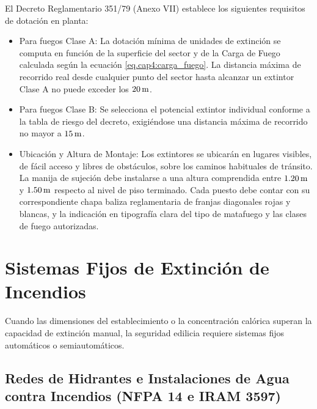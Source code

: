 El Decreto Reglamentario 351/79 (Anexo VII) establece los siguientes requisitos de dotación en planta:
\begin{itemize}
    \item Para fuegos Clase A: La dotación mínima de unidades de extinción se computa en función de la superficie del
          sector y de la Carga de Fuego calculada según la ecuación \ref{eq.cap4:carga_fuego}. La distancia máxima de
          recorrido real desde cualquier punto del sector hasta alcanzar un extintor Clase A no puede exceder los $20\,\mathrm{m}$.
    \item Para fuegos Clase B: Se selecciona el potencial extintor individual conforme a la tabla de riesgo del decreto,
          exigiéndose una distancia máxima de recorrido no mayor a $15\,\mathrm{m}$.
    \item Ubicación y Altura de Montaje: Los extintores se ubicarán en lugares visibles, de fácil acceso y libres de
          obstáculos, sobre los caminos habituales de tránsito. La manija de sujeción debe instalarse a una altura
          comprendida entre $1.20\,\mathrm{m}$ y $1.50\,\mathrm{m}$ respecto al nivel de piso terminado. Cada puesto debe contar con su
          correspondiente chapa baliza reglamentaria de franjas diagonales rojas y blancas, y la indicación en tipografía
          clara del tipo de matafuego y las clases de fuego autorizadas.
\end{itemize}

\section{Sistemas Fijos de Extinción de Incendios}
\label{sec.cap6:sistemas_fijos}

Cuando las dimensiones del establecimiento o la concentración calórica superan la capacidad de extinción manual, la
seguridad edilicia requiere sistemas fijos automáticos o semiautomáticos.

\subsection{Redes de Hidrantes e Instalaciones de Agua contra Incendios (NFPA 14 e IRAM 3597)}

